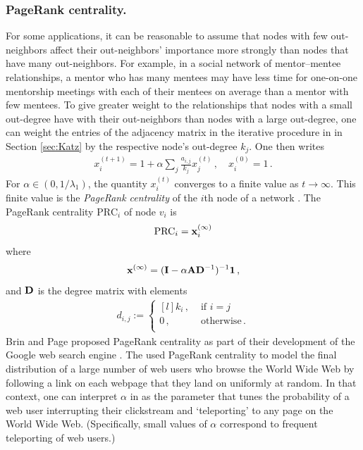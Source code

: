 \documentclass{comnet-mod}
\begin{document}
\subsubsection{PageRank centrality.}


For some applications, it can be reasonable to assume that nodes with few out-neighbors affect their out-neighbors' importance more strongly than nodes that have many out-neighbors. For example, in a social network of mentor--mentee relationships, a mentor who has many mentees may have less time for one-on-one mentorship meetings with each of their mentees on average than a mentor with few mentees. To give greater weight to the relationships that nodes with a small out-degree have with their out-neighbors than nodes with a large out-degree, one can weight the entries of the adjacency matrix in the iterative procedure in  in Section \ref{sec:Katz} by the respective node's out-degree $k_j$. One then writes
\begin{align}
	x_i^{(t+1)} = 1+\alpha\sum_j \frac{a_{i,j}}{k_j}{x_j^{(t)}}\,, \quad x_i^{(0)} = 1\,.\label{eq:pagerank}
\end{align}
For  $\alpha\in(0,1/\lambda_1)$, the quantity $x_i^{(t)}$ converges to a finite value as $t \rightarrow \infty$. This finite value is the \textit{PageRank centrality} of the $i$th node of a network \cite{Gleich2015}. The PageRank centrality $\textrm{PRC}_i$ of node $v_i$ is \cite[p.\,166]{Newman2018}
\begin{align}
	\textrm{PRC}_i = {\bf x}^{(\infty)}_i \nonumber
\end{align}
where 
\begin{align}
	{\bf x}^{(\infty)} = ({\bf I}-\alpha{\bf A}{\bf D}^{-1})^{-1}{\bf 1} \,,\nonumber
\end{align}
and $\bf D$ is the degree matrix with elements
\begin{align}
	d_{i,j}:= \left\{\begin{matrix*}[l]
		k_i\,,&\textrm{ if $i = j$}\\
		0\,,&\textrm{ otherwise}\,.\\
	\end{matrix*}\right. \nonumber
\end{align}
Brin and Page proposed PageRank centrality as part of their development of the Google web search engine \cite{Brin1998}. The used PageRank centrality to model the final distribution of a large number of web users who browse the World Wide Web by following a link on each webpage that they land on uniformly at random. In that context, one can interpret $\alpha$ in  as the parameter that tunes the probability of a web user interrupting their clickstream and `teleporting' to any page on the World Wide Web. (Specifically, small values of $\alpha$ correspond to frequent teleporting of web users.) 
\end{document}
